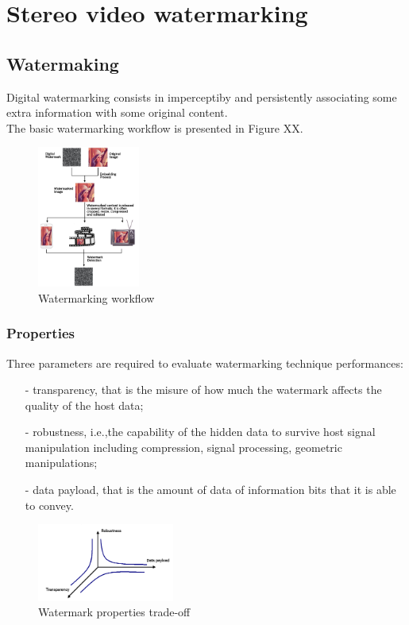 \chapter{Stereo video watermarking}
\label{wat}

\section{Watermaking}

Digital watermarking consists in imperceptiby and persistently associating some extra information with some original content. \\
The basic watermarking workflow is presented in Figure XX.\\
\begin{figure}[h!]
\centering
\includegraphics[width=0.3\textwidth]{./img/wat_workflow.png}
\caption{\small{Watermarking workflow}}
\label{fig:workflow}
\end{figure}
\newpage
\subsection{Properties}
Three parameters are required to evaluate watermarking technique performances:
\begin{itemize}
\item[-] transparency, that is the misure of how much the watermark affects the quality of the host data;
\item[-] robustness, i.e.,the capability of the hidden data to survive host signal manipulation including compression, signal processing, geometric manipulations;
\item[-] data payload, that is the amount of data of information bits that it is able to convey.
\end{itemize}
\begin{figure}[h!]
\centering
\includegraphics[width=0.4\textwidth]{./img/properties.png}
\caption{\small{Watermark properties trade-off}}
\label{fig:properties}
\end{figure}

